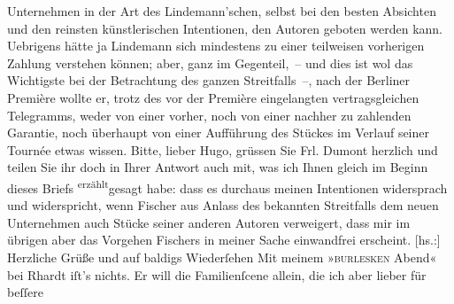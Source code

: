 \begin{ledgroupsized}[t]{13cm}
               Unternehmen in der Art des Lindemann’schen,
               selbst bei den besten Absichten und den reinsten künstlerischen Intentionen, den
               Autoren geboten werden kann.\pend
           \pstart
           Uebrigens hätte ja Lindemann sich mindestens zu
               einer teilweisen vorherigen Zahlung verstehen können; aber, ganz im Gegenteil, – und
               dies ist wol das Wichtigste bei der Betrachtung des ganzen Streitfalls –, nach der
                  Berliner Première wollte er, trotz des vor der
               Première eingelangten vertragsgleichen Telegramms, weder von einer vorher, noch von
               einer nachher zu zahlenden Garantie, noch überhaupt von einer Aufführung des Stückes im Verlauf seiner Tournée
               etwas wissen.\pend
           \pstart
           {\pb}Bitte, lieber Hugo, grüssen Sie Frl. Dumont herzlich und teilen Sie ihr doch in Ihrer Antwort auch
               mit, was ich Ihnen gleich im Beginn dieses Briefs \substVorne{}\textsuperscript{erzählt}{\allowbreak}\substDazwischen{}gesagt\substHinten{} habe: dass es durchaus meinen Intentionen widersprach und widerspricht, wenn
                  Fischer aus Anlass des bekannten Streitfalls
               dem neuen Unternehmen auch Stücke seiner anderen Autoren verweigert, dass mir im
               übrigen aber das Vorgehen Fischers in meiner
               Sache einwandfrei erscheint.\pend
           \pstart
           {[}hs.:{]} Herzliche Grüße und auf baldigs Wiederſehen Mit meinem »\textsc{burlesken} Abend« bei Rhardt iſt’s nichts. Er will die Familienſcene allein, die ich aber lieber für beſſere

\end{ledgroupsized}
